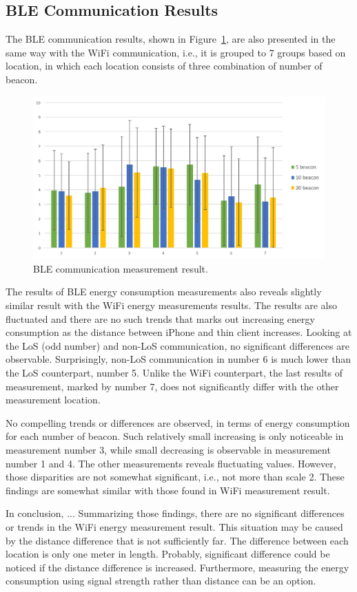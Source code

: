 \documentclass[journal]{vgtc}                %
\begin{document}
\subsection{BLE Communication Results} %
\label{sub:ble_communication_results}
The BLE communication results, shown in Figure~\ref{fig:ble-result}, are also presented in the same way with the WiFi communication, i.e., it is grouped to 7 groups based on location, in which each location consists of three combination of number of beacon.

\begin{figure}
  \centering
    \includegraphics[width=.5\textwidth]{ble}
  \caption{BLE communication measurement result.}
  \label{fig:ble-result}
\end{figure}

The results of BLE energy consumption measurements also reveals slightly similar result with the WiFi energy measurements results. The results are also fluctuated and there are no such trends that marks out increasing energy consumption as the distance between iPhone and thin client increases. Looking at the LoS (odd number) and non-LoS communication, no significant differences are observable. Surprisingly, non-LoS communication in number 6 is much lower than the LoS counterpart, number 5. Unlike the WiFi counterpart, the last results of measurement, marked by number 7, does not significantly differ with the other measurement location.

No compelling trends or differences are observed, in terms of energy consumption for each number of beacon. Such relatively small increasing is only noticeable in measurement number 3, while small decreasing is observable in measurement number 1 and 4. The other measurements reveals fluctuating values. However, those disparities are not somewhat significant, i.e., not more than scale 2. These findings are somewhat similar with those found in WiFi measurement result.

In conclusion, ...
Summarizing those findings, there are no significant differences or trends in the WiFi energy measurement result. This situation may be caused by the distance difference that is not sufficiently far. The difference between each location is only one meter in length. Probably, significant difference could be noticed if the distance difference is increased. Furthermore, measuring the energy consumption using signal strength rather than distance can be an option.
\end{document}
